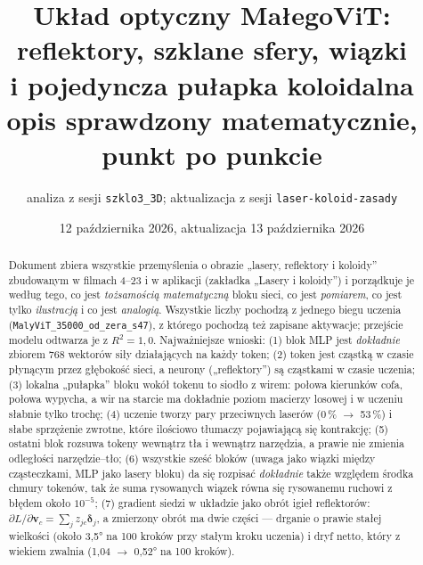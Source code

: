 \documentclass[a4paper,11pt]{article}
\title{Układ optyczny MałegoViT: reflektory, szklane sfery, wiązki\\ i pojedyncza pułapka koloidalna\\[4pt]\large opis sprawdzony matematycznie, punkt po punkcie}
\author{analiza z sesji \texttt{szklo3\_3D}; aktualizacja z sesji \texttt{laser-koloid-zasady}}
\date{12 października 2026, aktualizacja 13 października 2026}
\begin{document}
\maketitle
\sloppy

\begin{abstract}
Dokument zbiera wszystkie przemyślenia o obrazie „lasery, reflektory i koloidy” zbudowanym w filmach 4--23 i w aplikacji
(zakładka „Lasery i koloidy”) i porządkuje je według tego,
co jest \emph{tożsamością matematyczną} bloku sieci, co jest \emph{pomiarem}, co jest tylko \emph{ilustracją} i co jest \emph{analogią}.
Wszystkie liczby pochodzą z jednego biegu uczenia (\texttt{MalyViT\_35000\_od\_zera\_s47}), z którego pochodzą też zapisane aktywacje;
przejście modelu odtwarza je z $R^2 = 1{,}0$. Najważniejsze wnioski: (1) blok MLP jest \emph{dokładnie} zbiorem 768 wektorów siły
działających na każdy token; (2) token jest cząstką w czasie płynącym przez głębokość sieci, a neurony („reflektory”) są cząstkami
w czasie uczenia; (3) lokalna „pułapka” bloku wokół tokenu to siodło z wirem: połowa kierunków cofa, połowa wypycha, a wir
na starcie ma dokładnie poziom macierzy losowej i w uczeniu słabnie tylko trochę; (4) uczenie tworzy pary przeciwnych laserów
(0\,\% $\to$ 53\,\%) i słabe sprzężenie zwrotne, które ilościowo tłumaczy pojawiającą się kontrakcję; (5) ostatni blok
rozsuwa tokeny wewnątrz tła i wewnątrz narzędzia, a prawie nie zmienia odległości narzędzie--tło; (6) wszystkie sześć bloków
(uwaga jako wiązki między cząsteczkami, MLP jako lasery bloku) da się rozpisać \emph{dokładnie} także względem środka chmury tokenów,
tak że suma rysowanych wiązek równa się rysowanemu ruchowi z błędem około $10^{-5}$; (7) gradient siedzi w układzie jako obrót
igieł reflektorów: $\partial L/\partial\bm v_c=\sum_j z_{jc}\bm\delta_j$, a zmierzony obrót ma dwie części --- drganie o prawie stałej
wielkości (około 3,5° na 100 kroków przy stałym kroku uczenia) i dryf netto, który z wiekiem zwalnia (1,04 $\to$ 0,52° na 100 kroków).
\end{abstract}

\tableofcontents
\bigskip
\end{document}
